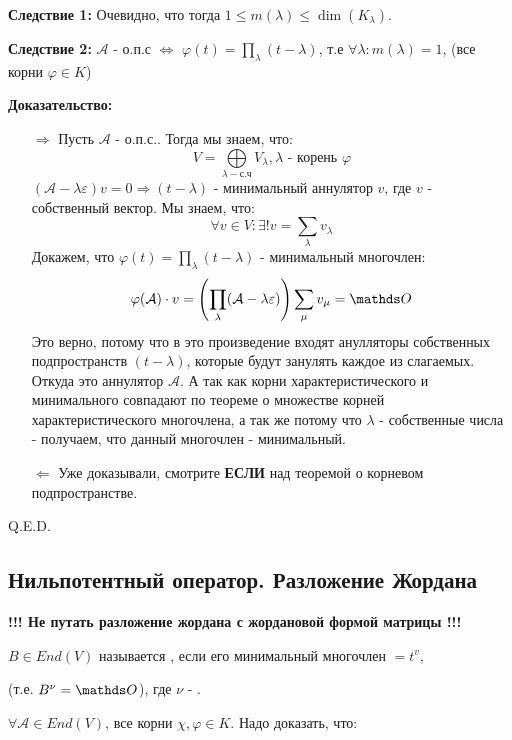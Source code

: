  
\textbf{Следствие 1:} Очевидно, что тогда $1 \leq m(\lambda) \leq \dim (K_{\lambda}) $.

\textbf{Следствие 2:} $\mathcal{A}$ - о.п.с $\Leftrightarrow$ $\varphi(t) = \prod\limits_{\lambda}(t-\lambda)$, т.е $\forall \lambda: m(\lambda) =1$, (все корни $\varphi \in K$)

\textbf{Доказательство:}
\begin{enumerate}
    \item[$\Rightarrow$] Пусть $\mathcal{A}$ - о.п.с.. Тогда мы знаем, что:
    $$V = \bigoplus\limits_{\lambda - \text{с.ч}}V_\lambda, \lambda \text{ - корень } \varphi$$
    $(\mathcal{A}-\lambda \varepsilon)v = 0 \Rightarrow (t-\lambda)$ - минимальный аннулятор $v$, где $v$ - собственный вектор. Мы знаем, что:
    $$\forall v \in V: \exists! v=\sum\limits_{\lambda}v_{\lambda}$$
    Докажем, что  $\varphi(t) = \prod\limits_{\lambda}(t-\lambda)$ - минимальный многочлен:
    $$\varphi(\mathcal{A})\cdot v =\left(\prod\limits_{\lambda}(\mathcal{A}-\lambda \varepsilon)\right)\sum\limits_{\mu}v_{\mu}  = \zero$$
    Это верно, потому что в это произведение входят анулляторы собственных подпространств $(t-\lambda)$, которые будут занулять каждое из слагаемых. Откуда это аннулятор $\mathcal{A}$. А так как корни характеристического и минимального совпадают по  теореме о множестве корней характеристического многочлена, а так же потому что $\lambda$ - собственные числа - получаем, что данный многочлен - минимальный.
    
    \item[$\Leftarrow$] Уже доказывали, смотрите \textbf{ЕСЛИ} над теоремой о корневом подпространстве.
\end{enumerate}
 \hfill Q.E.D.




\pagebreak


\subsection{Нильпотентный оператор. Разложение Жордана }

\textbf{!!! Не путать разложение жордана с жордановой формой матрицы !!!}

 $B \in End(V)$ называется , если его минимальный многочлен $ = t^v$,

(т.е. $B^\nu = \zero$), где $\nu$ - .



$\forall \mathcal{A}\in End(V)$, все корни $\chi,\varphi \in K$. Надо доказать, что:

